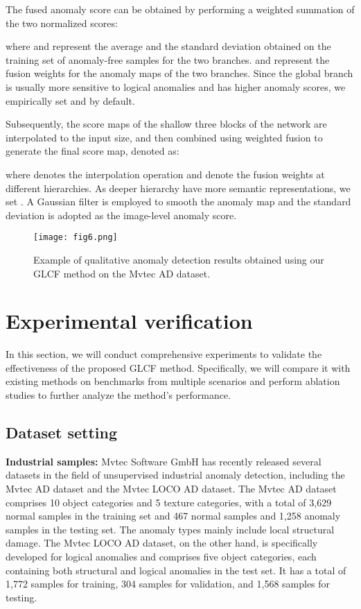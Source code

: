 \documentclass[lettersize,journal]{IEEEtran}
\begin{document}
The fused anomaly score can be obtained by performing a weighted summation of the two normalized scores:

where  and  represent the average and the standard deviation obtained on the training set of anomaly-free samples for the two branches.  and  represent the fusion weights for the anomaly maps of the two branches. Since the global branch is usually more sensitive to logical anomalies and has higher anomaly scores, we empirically set  and  by default.

Subsequently, the score maps of the shallow three blocks of the network are interpolated to the input size, and then combined using weighted fusion to generate the final score map, denoted as:


where  denotes the interpolation operation and  denote the fusion weights at different hierarchies. As deeper hierarchy have more semantic representations, we set . A Gaussian filter is employed to smooth the anomaly map and the standard deviation is adopted as the image-level anomaly score.


\begin{figure*}[t]
\centerline{\texttt{[image: fig6.png]}}
\caption[width=\textwidth]{
Example of qualitative anomaly detection results obtained using our GLCF method on the Mvtec AD dataset.}
\end{figure*}

\section{Experimental verification}

In this section, we will conduct comprehensive experiments to validate the effectiveness of the proposed GLCF method. Specifically, we will compare it with existing methods on benchmarks from multiple scenarios and perform ablation studies to further analyze the method's performance.

\subsection{Dataset setting}

\textbf{Industrial samples:} Mvtec Software GmbH has recently released several datasets in the field of unsupervised industrial anomaly detection, including the Mvtec AD dataset\cite{r28} and the Mvtec LOCO AD dataset\cite{r31}. The Mvtec AD dataset comprises 10 object categories and 5 texture categories, with a total of 3,629 normal samples in the training set and 467 normal samples and 1,258 anomaly samples in the testing set. The anomaly types mainly include local structural damage. The Mvtec LOCO AD dataset, on the other hand, is specifically developed for logical anomalies and comprises five object categories, each containing both structural and logical anomalies in the test set. It has a total of 1,772 samples for training, 304 samples for validation, and 1,568 samples for testing.
\end{document}
